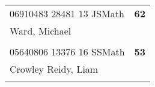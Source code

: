 \documentclass[a4paper,12pt]{article}
\begin{document}
\begin{tabular}{
   |p{9mm}|
    p{9mm}|
    p{9mm}|
    p{9mm}|
    p{9mm}|
    p{9mm}|
    p{9mm}|
    p{9mm}|
    p{9mm}|
    p{9mm}|}
      &    &    &    &    &    &    &    &    &     \\
\hline\hline
\multicolumn{9}{|l|}{06910483 28481 13 JSMath} & \textbf{62} \\
\hline
\multicolumn{10}{|l|}{Ward, Michael} \\
\hline
   \vrule height8mm width0pt depth2mm 
      &    &    &    &    &    &    &    &    &     \\
\hline\hline
\multicolumn{9}{|l|}{05640806 13376 16 SSMath} & \textbf{53} \\
\hline
\multicolumn{10}{|l|}{Crowley Reidy, Liam} \\
\hline
   \vrule height8mm width0pt depth2mm 
      &    &    &    &    &    &    &    &    &     \\
\hline\hline
\end{tabular}
\newpage
\end{document}
